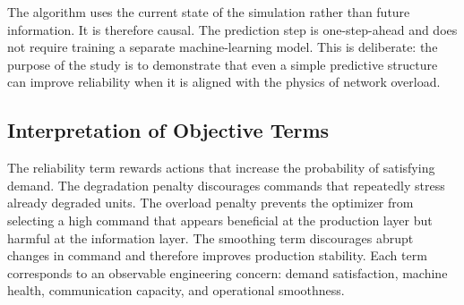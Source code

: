 \documentclass[journal]{IEEEtran}
\begin{document}
\begin{table}[H]
\centering
\caption{APRAC finite-action decision procedure.}
\label{alg:aprac}
\end{table}

The algorithm uses the current state of the simulation rather than future information. It is therefore causal. The prediction step is one-step-ahead and does not require training a separate machine-learning model. This is deliberate: the purpose of the study is to demonstrate that even a simple predictive structure can improve reliability when it is aligned with the physics of network overload.

\subsection{Interpretation of Objective Terms}

The reliability term rewards actions that increase the probability of satisfying demand. The degradation penalty discourages commands that repeatedly stress already degraded units. The overload penalty prevents the optimizer from selecting a high command that appears beneficial at the production layer but harmful at the information layer. The smoothing term discourages abrupt changes in command and therefore improves production stability. Each term corresponds to an observable engineering concern: demand satisfaction, machine health, communication capacity, and operational smoothness.
\end{document}
